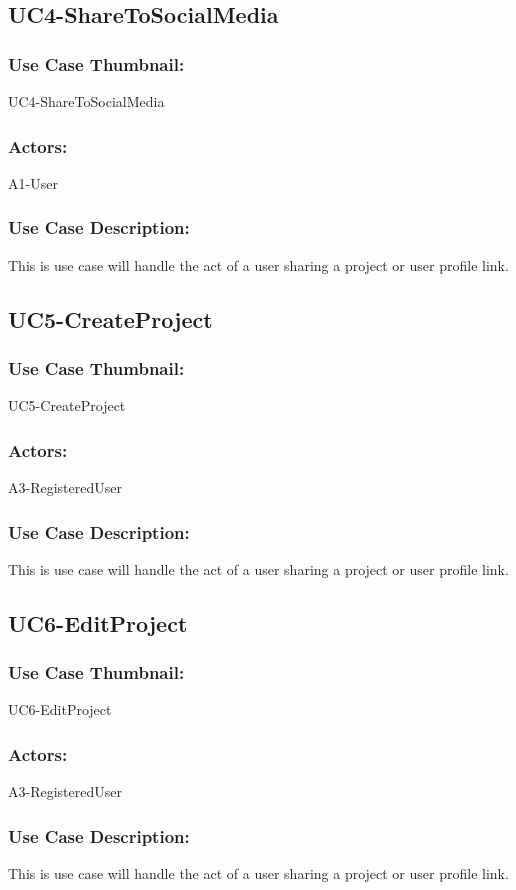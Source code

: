 \documentclass[11pt, openany]{report}
\begin{document}
\subsection{UC4-ShareToSocialMedia}
\label{sUC4}
\subsubsection*{Use Case Thumbnail:}
UC4-ShareToSocialMedia
\subsubsection*{Actors:}
A1-User
\subsubsection*{Use Case Description:}
This is use case will handle the act of a user sharing a project or user profile link.

\subsection{UC5-CreateProject}
\label{sUC5}
\subsubsection*{Use Case Thumbnail:}
UC5-CreateProject
\subsubsection*{Actors:}
A3-RegisteredUser
\subsubsection*{Use Case Description:}
This is use case will handle the act of a user sharing a project or user profile link.

\subsection{UC6-EditProject}
\label{sUC6}
\subsubsection*{Use Case Thumbnail:}
UC6-EditProject
\subsubsection*{Actors:}
A3-RegisteredUser
\subsubsection*{Use Case Description:}
This is use case will handle the act of a user sharing a project or user profile link.
\end{document}
